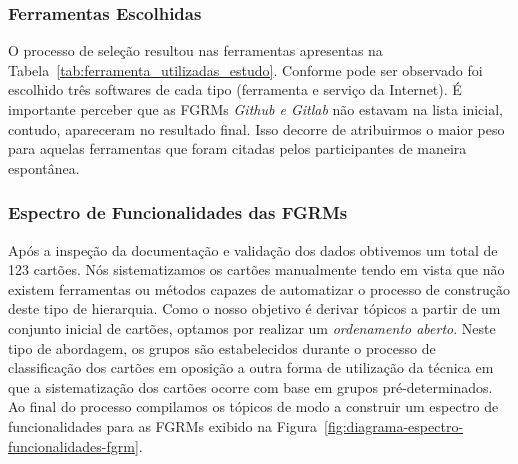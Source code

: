 \subsubsection{Ferramentas Escolhidas}
\label{subsec:resultados_ferramentas_escolhidas}

O processo de seleção resultou nas ferramentas apresentas na
Tabela~\ref{tab:ferramenta_utilizadas_estudo}. Conforme pode ser observado foi
escolhido três softwares de cada tipo (ferramenta e serviço da Internet). É
importante perceber que as FGRMs \textit{Github e Gitlab} não estavam na lista
inicial, contudo, apareceram no resultado final. Isso decorre de atribuirmos o
maior peso para aquelas ferramentas que foram citadas pelos participantes de
maneira espontânea.

\begin{table}[htpb]
\centering
{}
\caption{Ferramentas utilizados no estudo}
\label{tab:ferramenta_utilizadas_estudo}
\end{table}


\subsubsection{Espectro de Funcionalidades das FGRMs}
\label{subsec:categorizacao_ferramentas}

Após a inspeção da documentação e validação dos dados obtivemos um total de 123
cartões. Nós sistematizamos os cartões manualmente tendo em vista que não
existem ferramentas ou métodos capazes de automatizar o processo de construção
deste tipo de hierarquia. Como o nosso objetivo é derivar tópicos a partir de um
conjunto inicial de cartões, optamos por realizar um \textit{ordenamento
    aberto}. Neste tipo de abordagem, os grupos são estabelecidos durante o
processo de classificação dos cartões em oposição a outra forma de utilização da
técnica em que a sistematização dos cartões ocorre com base em grupos
pré-determinados. Ao final do processo compilamos os tópicos de modo a construir
um espectro de funcionalidades para as FGRMs exibido na
Figura~\ref{fig:diagrama-espectro-funcionalidades-fgrm}.

